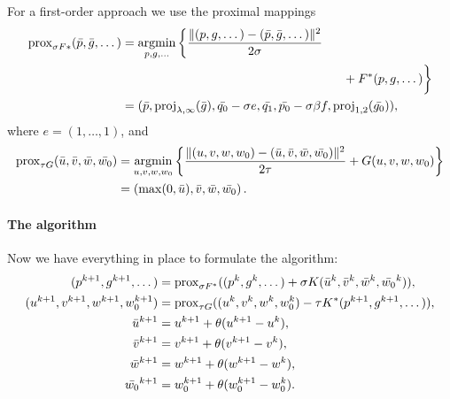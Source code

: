For a first-order approach we use the proximal mappings
\begin{align*}
    \Prox_{\sigma F*}(\bar{p},\bar{g},\dots)
    &= \argmin_{p,g,\dots} \left\{
        \frac{\|
            (p,g,\dots)
            -(\bar{p},\bar{g},\dots)
        \|^2}{2\sigma} \right. \\
    &\left.\hspace{5cm}\phantom{\frac{\|(\bar{g_0})\|^2}{2\sigma}}
        + F^*(p,g,\dots) \right\} \\
    &= (
        \bar{p},
        \proj_{\lambda,\infty}(\bar{g}),
        \bar{q_0}-\sigma e,
        \bar{q_1},
        \bar{p_0} - \sigma \beta f,
        \proj_{1,2}(\bar{g_0})
    ),
\end{align*}
where $e = (1,\dots,1)$, and
\begin{align*}
    \Prox_{\tau G}(\bar{u},\bar{v},\bar{w},\bar{w_0})
    &= \argmin_{u,v,w,w_0} \left\{
        \frac{
            \|(u,v,w,w_0)-(\bar{u},\bar{v},\bar{w},\bar{w_0})\|^2
        }{2\tau} + G(u,v,w,w_0)
    \right\} \\
    &= \left(
        \max(0,\bar{u}),
        \bar{v},
        \bar{w},
        \bar{w_0}
    \right).
\end{align*}

\paragraph{The algorithm}

Now we have everything in place to formulate the algorithm:
\begin{align*}
    (p^{k+1},g^{k+1},\dots)
    &= \operatorname{prox}_{\sigma F^*}(
        (p^{k},g^{k},\dots)
        + \sigma K(\bar{u}^{k},\bar{v}^{k},\bar{w}^{k},\bar{w_0}^{k})
    ), \\
    (u^{k+1},v^{k+1},w^{k+1},w_0^{k+1}) &= \operatorname{prox}_{\tau G}(
        (u^{k},v^{k},w^{k},w_0^{k})
        - \tau K^*(p^{k+1},g^{k+1},\dots)
    ), \\
    \bar{u}^{k+1} &= u^{k+1} + \theta(u^{k+1}-u^{k}), \\
    \bar{v}^{k+1} &= v^{k+1} + \theta(v^{k+1}-v^{k}), \\
    \bar{w}^{k+1} &= w^{k+1} + \theta(w^{k+1}-w^{k}), \\
    \bar{w_0}^{k+1} &= w_0^{k+1} + \theta(w_0^{k+1}-w_0^{k}).
\end{align*}

